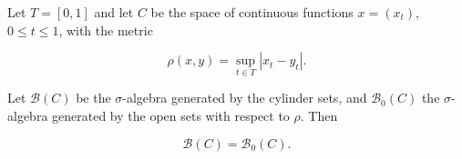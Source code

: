 Let $T = [0,1]$ and let $C$ be the space of continuous functions $x = (x_t)$, $0 \leq t \leq 1$, with the metric

$$\rho(x,y) = \sup_{t \in T} |x_t - y_t|.$$

Let $\mathcal{B}(C)$ be the $\sigma$-algebra generated by the cylinder sets, and $\mathcal{B}_0(C)$ the $\sigma$-algebra generated by the open sets with respect to $\rho$. Then

$$\mathcal{B}(C) = \mathcal{B}_0(C).$$
